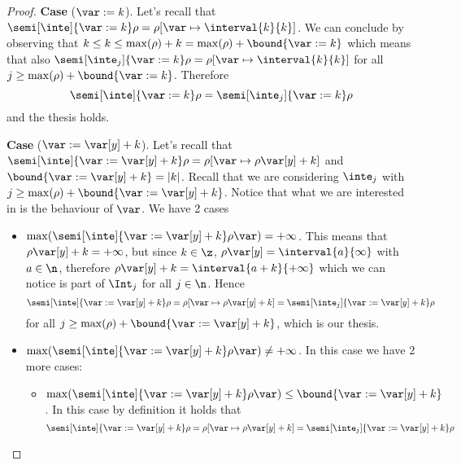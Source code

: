 \begin{proof}
  \medskip
  
  \noindent
  \textbf{Case} (\(\var := k\)).
  Let's recall that
  \({\semi[\inte]{\var := k}\rho = \rho[\var \mapsto \interval{k}{k}
    ]}\). We can conclude by observing that
  \({k \leq k \leq \max(\rho) + k = \max(\rho) + \bound{\var := k}}\)
  which means that also
  \({\semi[\inte_j]{\var := k}\rho = \rho[\var \mapsto
    \interval{k}{k}]}\) for all
  \(j\geq \max(\rho) + \bound{\var := k}\). Therefore
  \begin{equation*}
    \semi[\inte]{\var := k}\rho = \semi[\inte_j]{\var := k}\rho
  \end{equation*}
  and the thesis holds.

  \medskip
  
  \noindent
  \textbf{Case} (\(\var := \var[y] + k\)).
  Let's recall that
  \({\semi[\inte]{\var := \var[y] + k}\rho = \rho[\var \mapsto
    \rho\var[y] + k]}\) and \(\bound{\var := \var[y] + k} =
  |k|\). Recall that we are considering \(\inte_j\) with
  \(j \geq \max(\rho) + \bound{\var := \var[y] + k}\). Notice that
  what we are interested in is the behaviour of \(\var\). We have 2
  cases
  \begin{itemize}
  \item
    \({\max(\semi[\inte]{\var := \var[y] + k}\rho\var)} =
    +\infty\). This means that \(\rho\var[y] + k = +\infty\), but
    since \(k \in \z\), \(\rho\var[y] = \interval{a}{\infty}\) with
    \(a \in \n\), therefore
    \({\rho\var[y] + k} = {\interval{a+k}{+\infty}}\) which we can
    notice is part of \(\Int_j\) for all \(j \in \n\). Hence
    \begin{equation*}
      \semi[\inte]{\var := \var[y] + k}\rho =
      \rho[\var \mapsto \rho\var[y] + k] =
      \semi[\inte_j]{\var := \var[y] + k}\rho
    \end{equation*}
    for all \(j \geq \max(\rho) + \bound{\var := \var[y] + k}\), which
    is our thesis.
  \item
    \({\max(\semi[\inte]{\var := \var[y] + k}\rho\var)} \neq
    +\infty\). In this case we have 2 more cases:
    \begin{itemize}
    \item
      \({\max(\semi[\inte]{\var := \var[y] + k}\rho\var)} \leq
      \bound{\var := \var[y] + k}\). In this case by definition it
      holds that
      \begin{equation*}
        {\semi[\inte]{\var := \var[y] + k}\rho} = \rho[\var \mapsto \rho\var[y] + k] = {\semi[\inte_j]{\var := \var[y] + k}\rho}
      \end{equation*}

\end{itemize}
\end{itemize}
\end{proof}
